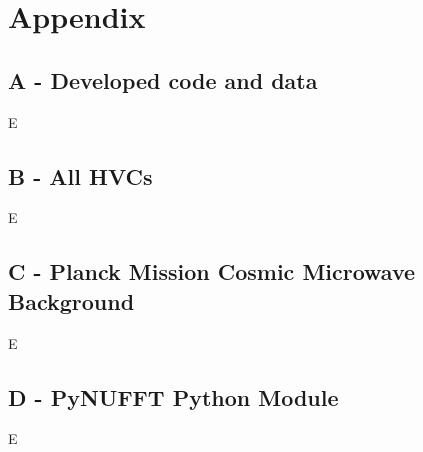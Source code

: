 \chapter{Appendix}
\label{cha:appendix}

\section{A - Developed code and data}
\label{sec:appendixA}

E

\section{B - All HVCs}
\label{sec:appendixB}

E

\section{C - Planck Mission Cosmic Microwave Background}
\label{sec:appendixC}

E

\section{D - PyNUFFT Python Module}
\label{sec:appendixD}

E